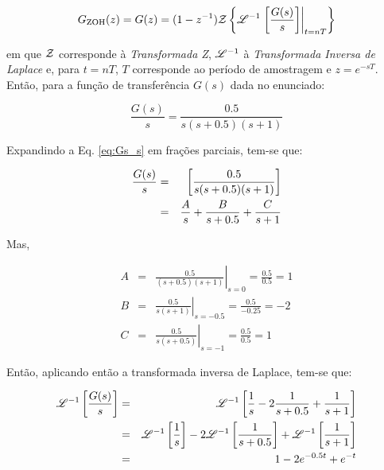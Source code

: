 \begin{equation}\label{eq:Gzoh}
G_{\text{ZOH}}(z) = 
G(z) = (1 - z^{-1})
       \mathcal{Z}\left\{\mathscr{L}^{-1}\left.\left[\frac{G(s)}{s}\right]\right|_{t = nT}\right\}
\end{equation}

\noindent em que $\mathcal{Z}$ corresponde à {\it Transformada Z}, $\mathscr{L}^{-1}$ à {\it
Transformada Inversa de Laplace} e, para $t = nT$, $T$ corresponde ao período de
amostragem e $z = e^{-sT}$. Então, para a função de transferência $G(s)$ dada no
enunciado:

\begin{equation}\label{eq:Gs_s}
\frac{G(s)}{s} = \frac{0.5}{s(s+0.5)(s+1)}
\end{equation}

Expandindo a Eq. \ref{eq:Gs_s} em frações parciais, tem-se que:

\begin{eqnarray}\label{eq:frac_parc}
\frac{G(s)}{s} & = & \left[\frac{0.5}{s(s+0.5)(s+1)}\right]\nonumber\\
& = & \frac{A}{s} + \frac{B}{s+0.5} + \frac{C}{s+1}\nonumber\\
\end{eqnarray}

Mas,

\begin{eqnarray}
A & = & \left.\frac{0.5}{(s+0.5)(s+1)}\right|_{s = 0} = \frac{0.5}{0.5} = 
                                                    1\nonumber\\
B & = & \left.\frac{0.5}{s(s+1)}\right|_{s = -0.5} = \frac{0.5}{-0.25} = 
                                                 -2\nonumber\\
C & = & \left.\frac{0.5}{s(s+0.5)}\right|_{s = -1} = \frac{0.5}{0.5} = 
                                                     1\nonumber
\end{eqnarray}

Então, aplicando então a transformada inversa de Laplace, tem-se que:

\begin{eqnarray}
\mathscr{L}^{-1}\left[\frac{G(s)}{s}\right]
& = & \mathscr{L}^{-1}\left[\frac{1}{s} - 
                         2\frac{1}{s+0.5} + 
                         \frac{1}{s+1}\right]\nonumber\\
& = & \mathscr{L}^{-1}\left[\frac{1}{s}\right] - 
      2\mathscr{L}^{-1}\left[\frac{1}{s+0.5}\right] + 
      \mathscr{L}^{-1}\left[\frac{1}{s+1}\right]\nonumber\\
& = & 1 - 2e^{-0.5t} + e^{-t}\label{eq:ilaplace}
\end{eqnarray}

